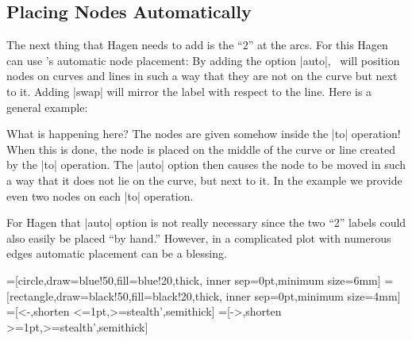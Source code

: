 \subsection{Placing Nodes Automatically}

The next thing that Hagen needs to add is the ``$2$'' at the arcs. For
this Hagen can use \tikzname's automatic node placement: By adding the
option |auto|, \tikzname\ will position nodes on curves and lines in
such a way that they are not on the curve but next to it. Adding
|swap| will mirror the label with respect to the line. Here is a
general example:

{
\begin{codeexample}[]
\end{codeexample}
}

What is happening here? The nodes are given somehow inside the |to|
operation! When this is done, the node is placed on the middle of the
curve or line created by the |to| operation. The |auto| option then
causes the node to be moved in such a way that it does not lie on the
curve, but next to it. In the example we provide even two nodes on
each |to| operation.

For Hagen that |auto| option is not really necessary since the two
``2'' labels could also easily be placed ``by hand.'' However, in a
complicated plot with numerous edges automatic placement can be a
blessing. 

{
=[circle,draw=blue!50,fill=blue!20,thick,
                   inner sep=0pt,minimum size=6mm]
=[rectangle,draw=black!50,fill=black!20,thick,
                        inner sep=0pt,minimum size=4mm]
=[<-,shorten <=1pt,>=stealth',semithick]  
=[->,shorten >=1pt,>=stealth',semithick]  
\begin{codeexample}[]
\end{codeexample}
}




